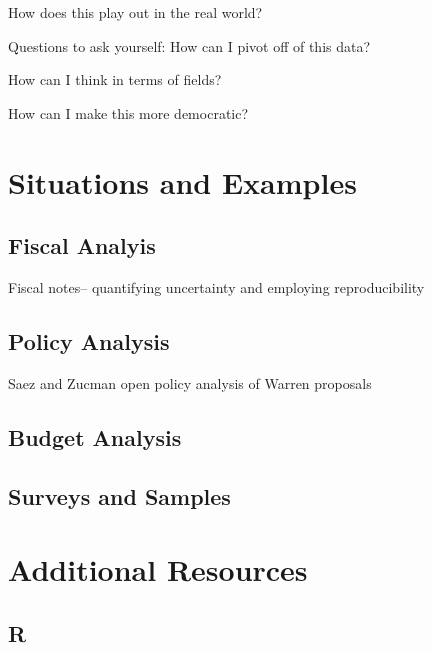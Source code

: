 \documentclass[]{book}
\begin{document}
How does this play out in the real world?

Questions to ask yourself:
How can I pivot off of this data?

How can I think in terms of fields?

How can I make this more democratic?

\hypertarget{situations-and-examples}{%
\section{Situations and Examples}\label{situations-and-examples}}

\hypertarget{fiscal-analyis}{%
\subsection{Fiscal Analyis}\label{fiscal-analyis}}

Fiscal notes-- quantifying uncertainty and employing reproducibility

\hypertarget{policy-analysis}{%
\subsection{Policy Analysis}\label{policy-analysis}}

Saez and Zucman open policy analysis of Warren proposals

\hypertarget{budget-analysis}{%
\subsection{Budget Analysis}\label{budget-analysis}}

\hypertarget{surveys-and-samples}{%
\subsection{Surveys and Samples}\label{surveys-and-samples}}

\hypertarget{additional-resources}{%
\section{Additional Resources}\label{additional-resources}}

\hypertarget{r}{%
\subsection{R}\label{r}}
\end{document}

